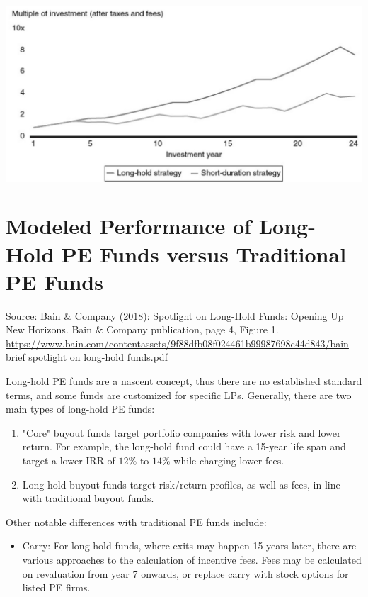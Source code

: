 \documentclass[11pt]{article}
\begin{document}
\begin{center}
\includegraphics[max width=\textwidth]{2024_04_10_d21380c1d129a5bbd875g-2}
\end{center}

\section*{Modeled Performance of Long-Hold PE Funds versus Traditional PE Funds}
Source: Bain \& Company (2018): Spotlight on Long-Hold Funds: Opening Up New Horizons. Bain \& Company publication, page 4, Figure 1. \href{https://www.bain.com/contentassets/9f88dfb08f024461b99987698c44d843/bain}{https://www.bain.com/contentassets/9f88dfb08f024461b99987698c44d843/bain} brief spotlight on long-hold funds.pdf

Long-hold PE funds are a nascent concept, thus there are no established standard terms, and some funds are customized for specific LPs. Generally, there are two main types of long-hold PE funds:

\begin{enumerate}
  \item "Core" buyout funds target portfolio companies with lower risk and lower return. For example, the long-hold fund could have a 15-year life span and target a lower IRR of $12 \%$ to $14 \%$ while charging lower fees.

  \item Long-hold buyout funds target risk/return profiles, as well as fees, in line with traditional buyout funds.

\end{enumerate}

Other notable differences with traditional PE funds include:

\begin{itemize}
  \item Carry: For long-hold funds, where exits may happen 15 years later, there are various approaches to the calculation of incentive fees. Fees may be calculated on revaluation from year 7 onwards, or replace carry with stock options for listed PE firms.
\end{itemize}
\end{document}
